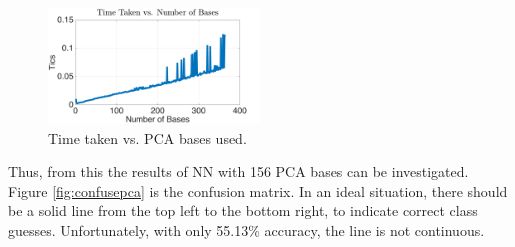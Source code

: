 \documentclass[a4paper, 10pt, conference]{ieeeconf}
\begin{document}
\begin{figure}[!ht]
    \centering
    \includegraphics[width=0.5\textwidth]{src/tics.png}
    \caption{Time taken vs. PCA bases used.}
    \label{fig:tics}
\end{figure}

Thus, from this the results of NN with 156 PCA bases can be investigated. Figure \ref{fig:confusepca} is the confusion matrix. In an ideal situation, there should be a solid line from the top left to the bottom right, to indicate correct class guesses. Unfortunately, with only 55.13\% accuracy, the line is not continuous.
\end{document}
